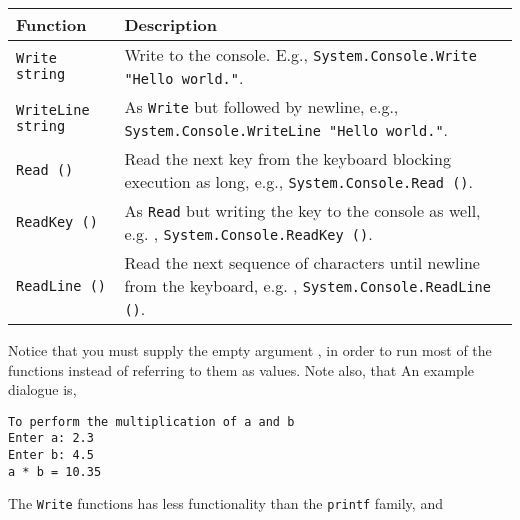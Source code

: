 \begin{center}
  \begin{tabularx}{\linewidth}{|l|X|}
    \hline
    Function & Description\\
    \hline
    \lstinline{Write string} & Write to the console. E.g., \mbox{\lstinline!System.Console.Write "Hello world."!}.\\
    \hline
    \lstinline{WriteLine string} & As \lstinline!Write! but followed by newline, e.g., \mbox{\lstinline!System.Console.WriteLine "Hello world."!}.\\
    \hline
    \lstinline{Read ()} & Read the next key from the keyboard blocking execution as long, e.g., \mbox{\lstinline!System.Console.Read ()!}.\\
    \hline
    \lstinline{ReadKey ()} & As \lstinline!Read! but writing the key to the console as well, e.g. , \mbox{\lstinline!System.Console.ReadKey ()!}.\\
    \hline
    \lstinline{ReadLine ()} & Read the next sequence of characters until newline from the keyboard, e.g. , \mbox{\lstinline!System.Console.ReadLine ()!}.\\
    \hline
  \end{tabularx}
\end{center}
Notice that you must supply the empty argument \lexeme{()}, in order to run most of the functions instead of referring to them as values. Note also, that 
%
%
An example dialogue is,
%
\begin{lstlisting}[language=console]
To perform the multiplication of a and b
Enter a: 2.3
Enter b: 4.5
a * b = 10.35
\end{lstlisting}
%
The \lstinline!Write! functions has less functionality than the \lstinline!printf! family, and 
 
